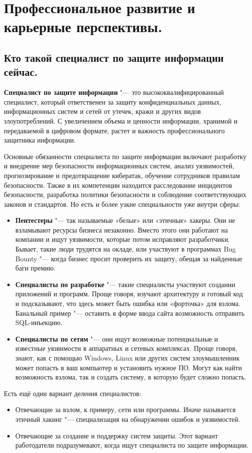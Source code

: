 \section{Профессиональное развитие и карьерные перспективы.}
\subsection{Кто такой специалист по защите информации сейчас.}
\textbf{Специалист по защите информации} "---  это высококвалифицированный специалист, который ответственен за защиту конфиденциальных 
данных, информационных систем и сетей от утечек, кражи и других видов злоупотреблений. С увеличением объема и ценности 
информации, хранимой и передаваемой в цифровом формате, растет и важность профессионального защитника информации.

Основные обязанности специалиста по защите информации включают разработку и внедрение мер безопасности информационных систем, 
анализ уязвимостей, прогнозирование и предотвращение кибератак, обучение сотрудников правилам безопасности. Также в их 
компетенции находится расследование инцидентов безопасности, разработка политики безопасности и соблюдение соответствующих 
законов и стандартов.
Но есть и более узкие специальности уже внутри сферы:
\begin{itemize}
    \item \textbf{Пентестеры} "---  так называемые «белые» или «этичные» хакеры. Они не взламывают ресурсы бизнеса незаконно. Вместо 
    этого они работают на компании и ищут уязвимости, которые потом исправляют разработчики. Бывает, такие люди трудятся на 
    окладе, или участвуют в программах Bug Bounty "---  когда бизнес просит проверить их защиту, обещая за найденные баги премию.
    \item \textbf{Специалисты по разработке} "--- такие специалисты участвуют создании приложений и программ. Проще говоря, 
    изучают архитектуру и готовый код и подсказывают, что здесь может быть ошибка или «форточка» для взлома. Банальный пример 
    "---  оставить в форме ввода сайта возможность отправить SQL-инъекцию.
    \item \textbf{Специалисты по сетям} "---  они ищут возможные потенциальные и известные уязвимости в аппаратных и сетевых 
    комплексах. Проще говоря, знают, как с помощью Windows, Linux или других систем злоумышленник может попасть в ваш 
    компьютер и установить нужное ПО. Могут как найти возможность взлома, так и создать систему, в которую будет сложно 
    попасть.
\end{itemize}
Есть ещё один вариант деления специалистов:
\begin{itemize}
    \item Отвечающие за взлом, к примеру, сети или программы. Иначе называется этичный хакинг "---  специализация на обнаружении ошибок и уязвимостей.
    \item Отвечающие за создание и поддержку систем защиты. Этот вариант работодатели подразумевают, когда ищут специалиста по защите информации\cite{habr}.
    
\end{itemize}

